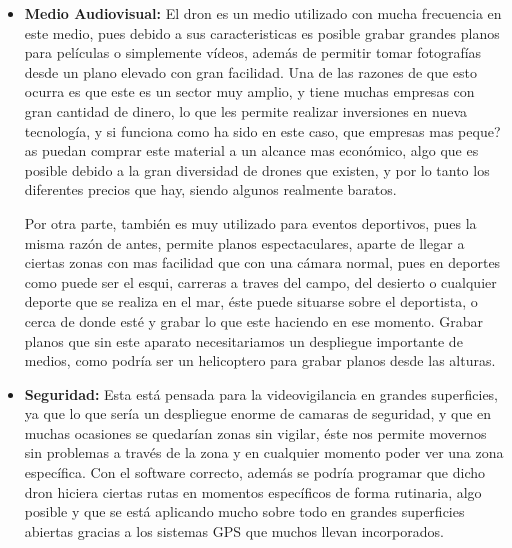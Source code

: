 \begin{itemize}
	\item \textbf{Medio Audiovisual:} El dron es un medio utilizado con mucha frecuencia en este medio, pues debido a sus caracteristicas es posible grabar grandes planos para pel\'iculas o simplemente v\'ideos, adem\'as de permitir tomar fotograf\'ias desde un plano elevado con gran facilidad. Una de las razones de que esto ocurra es que este es un sector muy amplio, y tiene muchas empresas con gran cantidad de dinero, lo que les permite realizar inversiones en nueva tecnolog\'ia, y si funciona como ha sido en este caso, que empresas mas peque?as puedan comprar este material a un alcance mas econ\'omico, algo que es posible debido a la gran diversidad de drones que existen, y por lo tanto los diferentes precios que hay, siendo algunos realmente baratos. 	
	
	\hspace{1 cm} Por otra parte, tambi\'en es muy utilizado para eventos deportivos, pues la misma raz\'on de antes, permite planos espectaculares, aparte de llegar a ciertas zonas con mas facilidad que con una c\'amara normal, pues en deportes como puede ser el esqui, carreras a traves del campo, del desierto o cualquier deporte que se realiza en el mar, \'este puede situarse sobre el deportista, o cerca de donde est\'e y grabar lo que este haciendo en ese momento. Grabar planos que sin este aparato necesitariamos un despliegue importante de medios, como podr\'ia ser un helicoptero para grabar planos desde las alturas. 
	
	\item \textbf{Seguridad:} Esta est\'a pensada para la videovigilancia en grandes superficies, ya que lo que ser\'ia un despliegue enorme de camaras de seguridad, y que en muchas ocasiones se quedar\'ian zonas sin vigilar, \'este nos permite movernos sin problemas a trav\'es de la zona y en cualquier momento poder ver una zona espec\'ifica. Con el software correcto, adem\'as se podr\'ia programar que dicho dron hiciera ciertas rutas en momentos espec\'ificos de forma rutinaria, algo posible y que se est\'a aplicando mucho sobre todo en grandes superficies abiertas gracias a los sistemas GPS que muchos llevan incorporados.
	

\end{itemize}
